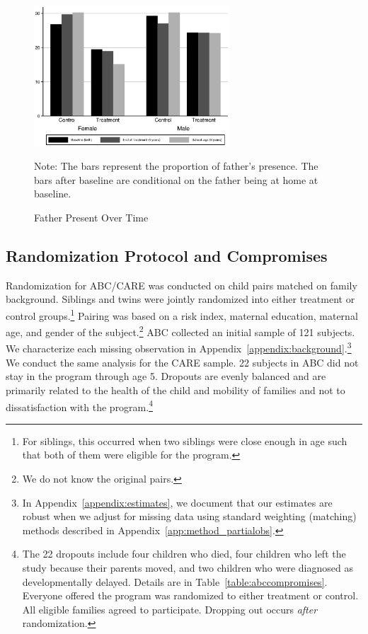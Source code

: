 \begin{figure}[H]
\begin{center}
\caption{Father Present Over Time}
\label{fig:family-over-time}
		\label{fig:fhome}
			\includegraphics[width=0.65\textwidth]{output/family-fhome}
\end{center}
\footnotesize \justify
Note: The bars represent the proportion of father's presence. The bars after baseline are conditional on the father being at home at baseline.
\end{figure}

\subsection{Randomization Protocol and Compromises} \label{section:randomization}

Randomization for ABC/CARE was conducted on child pairs matched on family background. Siblings and twins were jointly randomized into either treatment or control groups.\footnote{For siblings, this occurred when two siblings were close enough in age such that both of them were eligible for the program.} Pairing was based on a risk index, maternal education, maternal age, and gender of the subject.\footnote{We do not know the original pairs.} ABC collected an initial sample of 121 subjects. We characterize each missing observation in Appendix~\ref{appendix:background}.\footnote{In Appendix~\ref{appendix:estimates}, we document that our estimates are robust when we adjust for missing data using standard weighting (matching) methods described in Appendix~\ref{app:method_partialobs}.} We conduct the same analysis for the CARE sample. 22 subjects in ABC did not stay in the program through age 5. Dropouts are evenly balanced and are primarily related to the health of the child and mobility of families and not to dissatisfaction with the program.\footnote{The 22 dropouts include four children who died, four children who left the study because their parents moved, and two children who were diagnosed as developmentally delayed. Details are in Table~\ref{table:abccompromises}. Everyone offered the program was randomized to either treatment or control. All eligible families agreed to participate. Dropping out occurs \emph{after} randomization.}

